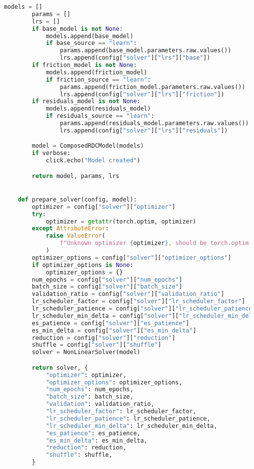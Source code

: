\begin{lstlisting}[language=python, caption=\raggedright{identification/full.py}, frame=single]
        models = []
        params = []
        lrs = []
        if base_model is not None:
            models.append(base_model)
            if base_source == "learn":
                params.append(base_model.parameters.raw.values())
                lrs.append(config["solver"]["lrs"]["base"])
        if friction_model is not None:
            models.append(friction_model)
            if friction_source == "learn":
                params.append(friction_model.parameters.raw.values())
                lrs.append(config["solver"]["lrs"]["friction"])
        if residuals_model is not None:
            models.append(residuals_model)
            if residuals_source == "learn":
                params.append(residuals_model.parameters.raw.values())
                lrs.append(config["solver"]["lrs"]["residuals"])

        model = ComposedRDCModel(models)
        if verbose:
            click.echo("Model created")

        return model, params, lrs


    def prepare_solver(config, model):
        optimizer = config["solver"]["optimizer"]
        try:
            optimizer = getattr(torch.optim, optimizer)
        except AttributeError:
            raise ValueError(
                f"Unknown optimizer {optimizer}, should be torch.optim.<optimizer>"
            )
        optimizer_options = config["solver"]["optimizer_options"]
        if optimizer_options is None:
            optimizer_options = {}
        num_epochs = config["solver"]["num_epochs"]
        batch_size = config["solver"]["batch_size"]
        validation_ratio = config["solver"]["validation_ratio"]
        lr_scheduler_factor = config["solver"]["lr_scheduler_factor"]
        lr_scheduler_patience = config["solver"]["lr_scheduler_patience"]
        lr_scheduler_min_delta = config["solver"]["lr_scheduler_min_delta"]
        es_patience = config["solver"]["es_patience"]
        es_min_delta = config["solver"]["es_min_delta"]
        reduction = config["solver"]["reduction"]
        shuffle = config["solver"]["shuffle"]
        solver = NonLinearSolver(model)

        return solver, {
            "optimizer": optimizer,
            "optimizer_options": optimizer_options,
            "num_epochs": num_epochs,
            "batch_size": batch_size,
            "validation": validation_ratio,
            "lr_scheduler_factor": lr_scheduler_factor,
            "lr_scheduler_patience": lr_scheduler_patience,
            "lr_scheduler_min_delta": lr_scheduler_min_delta,
            "es_patience": es_patience,
            "es_min_delta": es_min_delta,
            "reduction": reduction,
            "shuffle": shuffle,
        }



\end{lstlisting}
